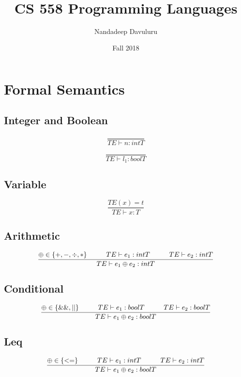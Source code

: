 \documentclass{article}
\title{CS 558 Programming Languages}
\author{Nandadeep Davuluru}
\date{Fall 2018}
\newcommand\tab[1][1cm]{\hspace*{#1}}
\begin{document}
\maketitle

\section{Formal Semantics}

    \subsection{Integer and Boolean}
        \begin{equation}
            \frac{}{TE \vdash n : intT}
        \end{equation}

        \begin{equation}
            \frac{}{TE \vdash l_1 : boolT}
        \end{equation}

    \subsection{Variable}
        \begin{equation}
            \frac{TE(x) = t}{TE \vdash x : T}
        \end{equation}
    \subsection{Arithmetic}
        \begin{equation}
            \frac{\oplus \in \{+, -, \div, *\} \tab TE \vdash e_1 : intT \tab TE \vdash e_2 : intT}{TE \vdash e_1 \oplus e_2 : intT}
        \end{equation}
    \subsection{Conditional}
        \begin{equation}
            \frac{\oplus \in \{\&\&, || \} \tab TE \vdash e_1 : boolT \tab TE \vdash e_2 : boolT}{TE \vdash e_1 \oplus e_2 : boolT}
        \end{equation}
    \subsection{Leq}
        \begin{equation}
            \frac{\oplus \in \{ <= \} \tab TE \vdash e_1 : intT \tab TE \vdash e_2 : intT}{TE \vdash e_1 \oplus e_2 : boolT}
        \end{equation}
\end{document}
